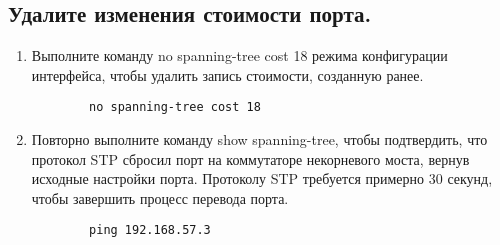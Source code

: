 \subsection{Удалите изменения стоимости порта.}
\begin{enumerate}[a]
    \item Выполните команду no spanning-tree cost 18 режима конфигурации интерфейса, чтобы удалить
    запись стоимости, созданную ранее.
    \begin{verbatim}
        no spanning-tree cost 18
    \end{verbatim}

    \item Повторно выполните команду show spanning-tree, чтобы подтвердить, что протокол STP сбросил
    порт на коммутаторе некорневого моста, вернув исходные настройки порта.
    Протоколу STP требуется примерно 30 секунд, чтобы завершить процесс перевода порта.
    \begin{verbatim}
        ping 192.168.57.3
    \end{verbatim}
\end{enumerate}